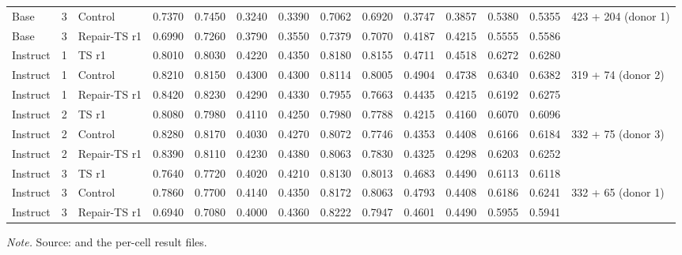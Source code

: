 {\begin{longtable}{@{}lclrrrrrrrrrrl@{}}
Base & 3 & Control & 0.7370 & 0.7450 & 0.3240 & 0.3390 & 0.7062 & 0.6920 & 0.3747 & 0.3857 & 0.5380 & 0.5355 & 423 + 204 (donor 1)\\
Base & 3 & Repair-TS r1 & 0.6990 & 0.7260 & 0.3790 & 0.3550 & 0.7379 & 0.7070 & 0.4187 & 0.4215 & 0.5555 & 0.5586 & \\
\midrule
Instruct & 1 & TS r1 & 0.8010 & 0.8030 & 0.4220 & 0.4350 & 0.8180 & 0.8155 & 0.4711 & 0.4518 & 0.6272 & 0.6280 & \\
Instruct & 1 & Control & 0.8210 & 0.8150 & 0.4300 & 0.4300 & 0.8114 & 0.8005 & 0.4904 & 0.4738 & 0.6340 & 0.6382 & 319 + 74 (donor 2)\\
Instruct & 1 & Repair-TS r1 & 0.8420 & 0.8230 & 0.4290 & 0.4330 & 0.7955 & 0.7663 & 0.4435 & 0.4215 & 0.6192 & 0.6275 & \\
\midrule
Instruct & 2 & TS r1 & 0.8080 & 0.7980 & 0.4110 & 0.4250 & 0.7980 & 0.7788 & 0.4215 & 0.4160 & 0.6070 & 0.6096 & \\
Instruct & 2 & Control & 0.8280 & 0.8170 & 0.4030 & 0.4270 & 0.8072 & 0.7746 & 0.4353 & 0.4408 & 0.6166 & 0.6184 & 332 + 75 (donor 3)\\
Instruct & 2 & Repair-TS r1 & 0.8390 & 0.8110 & 0.4230 & 0.4380 & 0.8063 & 0.7830 & 0.4325 & 0.4298 & 0.6203 & 0.6252 & \\
\midrule
Instruct & 3 & TS r1 & 0.7640 & 0.7720 & 0.4020 & 0.4210 & 0.8130 & 0.8013 & 0.4683 & 0.4490 & 0.6113 & 0.6118 & \\
Instruct & 3 & Control & 0.7860 & 0.7700 & 0.4140 & 0.4350 & 0.8172 & 0.8063 & 0.4793 & 0.4408 & 0.6186 & 0.6241 & 332 + 65 (donor 1)\\
Instruct & 3 & Repair-TS r1 & 0.6940 & 0.7080 & 0.4000 & 0.4360 & 0.8222 & 0.7947 & 0.4601 & 0.4490 & 0.5955 & 0.5941 & \\
\end{longtable}
}
\vspace{-0.6\baselineskip}
{\footnotesize\color{slate}\textit{Note.} Source:  and the per-cell result files.\par}
\medskip

